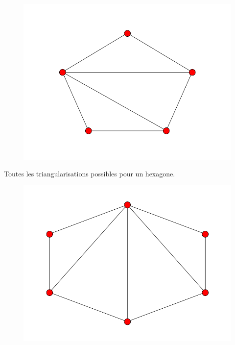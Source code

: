 \documentclass[fontsize=10pt]{article}
\begin{document}
\begin{figure}[hbtp]
\centering
\includegraphics[scale=0.5]{imgs/pentagon/pentagon_5.png}
\end{figure}

\newpage
Toutes les triangularisations possibles pour un hexagone.

\begin{figure}[hbtp]
\centering
\includegraphics[scale=0.5]{imgs/hexagon/hexagon_1.png}
\end{figure}
\end{document}
